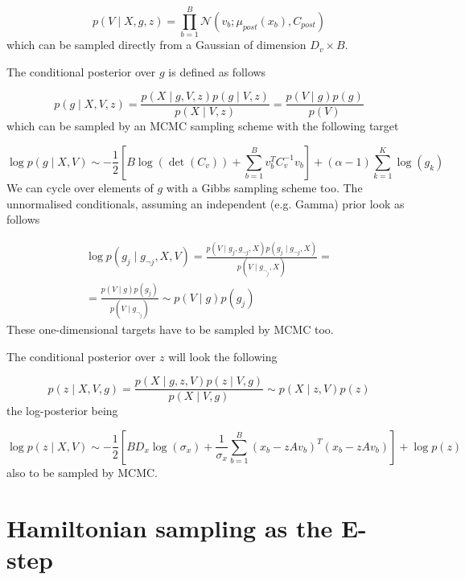 \documentclass{paper}
\begin{document}
\begin{equation}
p(V \mid X,g,z) = \prod_{b=1}^B \mathcal{N} \left(v_b; \mu_{post}(x_b),C_{post} \right)
\end{equation}
%
which can be sampled directly from a Gaussian of dimension $D_v \times B$. 

The conditional posterior over $g$ is defined as follows

\begin{equation} 
p(g \mid X,V,z) = \frac{p(X \mid g,V,z) p(g \mid V,z)}{p(X \mid V,z)} = \frac{p(V \mid g) p(g)}{p(V)}
\end{equation}
%
which can be sampled by an MCMC sampling scheme with the following target

\begin{equation} \label{eq:g_cond_logpost}
\log p(g \mid X,V) \sim -\frac{1}{2} \left[B\log(\det(C_v)) + \sum_{b=1}^B v_b^T C_v^{-1} v_b\right] + (\alpha-1) \sum_{k=1}^K \log(g_k)
\end{equation}
%
We can cycle over elements of $g$ with a Gibbs sampling scheme too. The unnormalised conditionals, assuming an independent (e.g. Gamma) prior look as follows

\begin{equation} 
\begin{split}
\log p(g_j \mid g_{\neg j},X,V) = \frac{p(V \mid g_j,g_{\neg j},X) p(g_j \mid g_{\neg j},X)}{p(V \mid g_{\neg_j},X)} = \\
= \frac{ p(V \mid g) p(g_j) }{ p(V \mid g_{\neg_j}) } \sim p(V \mid g) p(g_j)
\end{split}
\end{equation}
%
These one-dimensional targets have to be sampled by MCMC too. 

The conditional posterior over $z$ will look the following

\begin{equation} 
p(z \mid X,V,g) = \frac{p(X \mid g,z,V) p(z \mid V,g)}{p(X \mid V,g)} \sim p(X \mid z,V) p(z)
\end{equation}
% 
the log-posterior being

\begin{equation} 
\log p(z \mid X,V) \sim -\frac{1}{2} \left[B D_x\log(\sigma_x) + \frac{1}{\sigma_x} \sum_{b=1}^B (x_b - zAv_b)^T (x_b - zAv_b)\right] + \log p(z)
\end{equation}
%
also to be sampled by MCMC.


\section{Hamiltonian sampling as the E-step}
\end{document}
